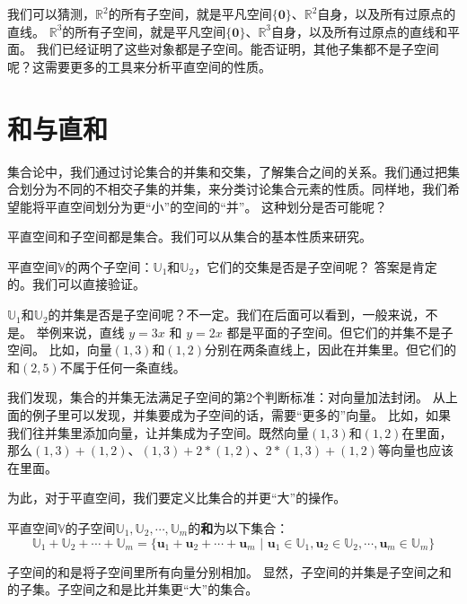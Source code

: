 \documentclass[12pt,UTF8]{ctexbook}
\begin{document}
我们可以猜测，$\mathbb{R}^2$的所有子空间，就是平凡空间$\{\mathbf{0}\}$、$\mathbb{R}^2$自身，以及所有过原点的直线。
$\mathbb{R}^3$的所有子空间，就是平凡空间$\{\mathbf{0}\}$、$\mathbb{R}^3$自身，以及所有过原点的直线和平面。
我们已经证明了这些对象都是子空间。能否证明，其他子集都不是子空间呢？这需要更多的工具来分析平直空间的性质。

\section{和与直和}
集合论中，我们通过讨论集合的并集和交集，了解集合之间的关系。我们通过把集合划分为不同的不相交子集的并集，来分类讨论集合元素的性质。同样地，我们希望能将平直空间划分为更“小”的空间的“并”。
这种划分是否可能呢？

平直空间和子空间都是集合。我们可以从集合的基本性质来研究。

平直空间$\mathbb{V}$的两个子空间：$\mathbb{U}_1$和$\mathbb{U}_2$，它们的交集是否是子空间呢？
答案是肯定的。我们可以直接验证。

$\mathbb{U}_1$和$\mathbb{U}_2$的并集是否是子空间呢？不一定。我们在后面可以看到，一般来说，不是。
举例来说，直线 $y = 3x$ 和 $y = 2x$ 都是平面的子空间。但它们的并集不是子空间。
比如，向量$(1,3)$和$(1,2)$分别在两条直线上，因此在并集里。但它们的和$(2,5)$不属于任何一条直线。

我们发现，集合的并集无法满足子空间的第2个判断标准：对向量加法封闭。
从上面的例子里可以发现，并集要成为子空间的话，需要“更多的”向量。
比如，如果我们往并集里添加向量，让并集成为子空间。既然向量$(1,3)$和$(1,2)$在里面，那么$(1,3)+(1,2)$、$(1,3)+2*(1,2)$、$2*(1,3)+(1,2)$等向量也应该在里面。

为此，对于平直空间，我们要定义比集合的并更“大”的操作。
\begin{df}\label{df:1_3}
    平直空间$\mathbb{V}$的子空间$\mathbb{U}_1, \mathbb{U}_2, \cdots , \mathbb{U}_m$的\textbf{和}为以下集合：\\
    $$ \mathbb{U}_1 + \mathbb{U}_2 + \cdots +\mathbb{U}_m = \{\mathbf{u}_1+\mathbf{u}_2+\cdots+\mathbf{u}_m \,\, | \,\, \mathbf{u}_1 \in \mathbb{U}_1, \mathbf{u}_2 \in \mathbb{U}_2, \cdots , \mathbf{u}_m \in \mathbb{U}_m \}$$
\end{df}

子空间的和是将子空间里所有向量分别相加。
显然，子空间的并集是子空间之和的子集。子空间之和是比并集更“大”的集合。
\end{document}
